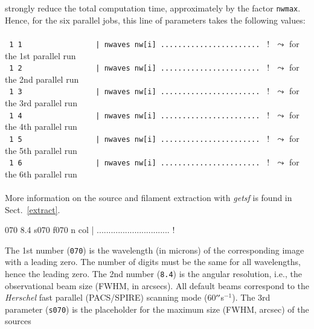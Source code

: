 \documentclass[a4paper,10pt]{article}
\newcommand*{\arcsec}{^{\prime\prime}\mkern-1.2mu}
\begin{document}
strongly reduce the total computation time, approximately by the factor \verb!nwmax!. Hence, for the six parallel jobs, this line
of parameters takes the following values:\\
\vspace{-2mm}\noindent\\
{\small\verb! 1 1                 | nwaves nw[i] ....................... ! !} $\,\,\leadsto$ for the 1st parallel run\\
{\small\verb! 1 2                 | nwaves nw[i] ....................... ! !} $\,\,\leadsto$ for the 2nd parallel run\\
{\small\verb! 1 3                 | nwaves nw[i] ....................... ! !} $\,\,\leadsto$ for the 3rd parallel run\\
{\small\verb! 1 4                 | nwaves nw[i] ....................... ! !} $\,\,\leadsto$ for the 4th parallel run\\
{\small\verb! 1 5                 | nwaves nw[i] ....................... ! !} $\,\,\leadsto$ for the 5th parallel run\\
{\small\verb! 1 6                 | nwaves nw[i] ....................... ! !\vspace{-2mm}} $\,\,\leadsto$ for the 6th parallel run\\\\
More information on the source and filament extraction with \textsl{getsf} is found in Sect.~\ref{extract}.
\begin{verbnobox}[\mbox{}\small]
 070  8.4 s070 f070 n col | ............................... !
\end{verbnobox}
The 1st number (\verb!070!) is the wavelength (in microns) of the corresponding image with a leading zero. The number of digits
must be the same for all wavelengths, hence the leading zero. The 2nd number (\verb!8.4!) is the angular resolution, i.e., the
observational beam size (FWHM, in arcsecs). All default beams correspond to the \emph{Herschel} fast parallel (PACS/SPIRE) scanning
mode (60$\arcsec$s$^{-1}$). The 3rd parameter (\verb!s070!) is the placeholder for the maximum size (FWHM, arcsec) of the sources
\end{document}
